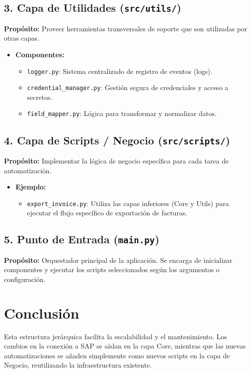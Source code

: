 \documentclass{article}
\begin{document}
\subsection{3. Capa de Utilidades (\texttt{src/utils/})}
\textbf{Propósito:} Proveer herramientas transversales de soporte que son utilizadas por otras capas.

\begin{itemize}
    \item \textbf{Componentes:}
    \begin{itemize}
        \item \texttt{logger.py}: Sistema centralizado de registro de eventos (logs).
        \item \texttt{credential\_manager.py}: Gestión segura de credenciales y acceso a secretos.
        \item \texttt{field\_mapper.py}: Lógica para transformar y normalizar datos.
    \end{itemize}
\end{itemize}

\subsection{4. Capa de Scripts / Negocio (\texttt{src/scripts/})}
\textbf{Propósito:} Implementar la lógica de negocio específica para cada tarea de automatización.

\begin{itemize}
    \item \textbf{Ejemplo:}
    \begin{itemize}
        \item \texttt{export\_invoice.py}: Utiliza las capas inferiores (Core y Utils) para ejecutar el flujo específico de exportación de facturas.
    \end{itemize}
\end{itemize}

\subsection{5. Punto de Entrada (\texttt{main.py})}
\textbf{Propósito:} Orquestador principal de la aplicación. Se encarga de inicializar componentes y ejecutar los scripts seleccionados según los argumentos o configuración.

\section{Conclusión}
Esta estructura jerárquica facilita la escalabilidad y el mantenimiento. Los cambios en la conexión a SAP se aíslan en la capa Core, mientras que las nuevas automatizaciones se añaden simplemente como nuevos scripts en la capa de Negocio, reutilizando la infraestructura existente.
\end{document}
